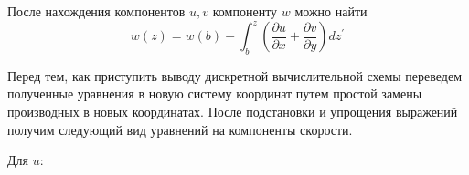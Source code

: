 После нахождения компонентов $u,v$ компоненту $w$ можно найти
\begin{equation*}
    w \left( z \right)
    =
    w \left( b \right)
    -
    \int_{b}^{z}
        \left(
            \frac
                {\partial u}
                {\partial x}
            +
            \frac
                {\partial v}
                {\partial y}
        \right)
        d z^{'}
\end{equation*}

Перед тем, как приступить выводу дискретной вычислительной 
схемы переведем полученные уравнения в новую систему координат
путем простой замены производных в новых координатах.
После подстановки и упрощения выражений получим следующий 
вид уравнений на компоненты скорости.

Для $u$:

